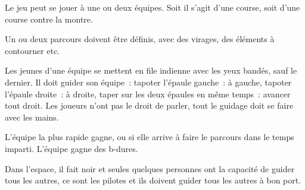 \documentclass{grand-jeu}
\begin{document}
\begin{liste-materiel}
\end{liste-materiel}

\begin{regles}
Le jeu peut se jouer à une ou deux équipes. Soit il s’agit d’une course, soit d’une course contre la montre.

Un ou deux parcours doivent être définis, avec des virages, des éléments à contourner etc.

Les jeunes d’une équipe se mettent en file indienne avec les yeux bandés, sauf le dernier. Il doit guider son équipe : tapoter l’épaule gauche : à gauche, tapoter l’épaule droite : à droite, taper sur les deux épaules en même temps : avancer tout droit. Les joueurs n’ont pas le droit de parler, tout le guidage doit se faire avec les mains.

L’équipe la plus rapide gagne, ou si elle arrive à faire le parcours dans le temps imparti. L'équipe gagne des b-dures.
\end{regles}

\begin{imaginaire}
Dans l’espace, il fait noir et seules quelques personnes ont la capacité de guider tous les autres, ce sont les pilotes et ils doivent guider tous les autres à bon port.
\end{imaginaire}

\begin{moments-stop}
\end{moments-stop}
\end{document}
